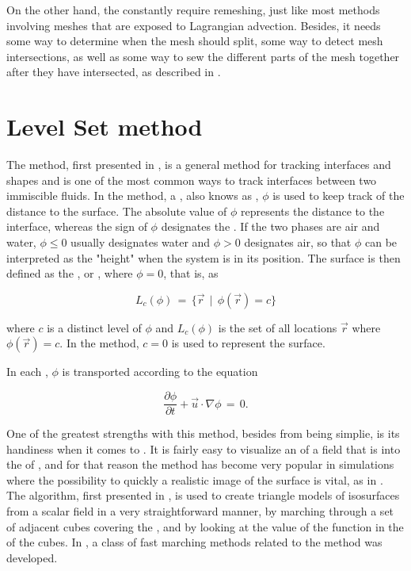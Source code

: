 On the other hand, the constantly require remeshing, just like most methods involving meshes that are exposed to Lagrangian advection. Besides, it needs some way to determine when the mesh should split, some way to detect mesh intersections, as well as some way to sew the different parts of the mesh together after they have intersected, as described in \citep{Wojtan2009}.

\section{Level Set method}

The \LS method, first presented in \citep{Osher1988}, is a general method for tracking interfaces and shapes and is one of the most common ways to track interfaces between two immiscible fluids. In the \LS method, a , also knows as , $\phi$ is used to keep track of the distance to the surface. The absolute value of $\phi$ represents the distance to the interface, whereas the sign of $\phi$ designates the \phase. If the two phases are air and water, $\phi \leq 0$ usually designates water and $\phi > 0$ designates air, so that $\phi$ can be interpreted as the "height" when the system is in its \equilibrium position. The surface is then defined as the \isosurface, or , where $\phi = 0$, that is, as

\begin{equation} \label{eq:level_set}
L_c(\phi) \,=\, \{\vec{r} \,\mid\, \phi(\vec{r})=c\}
\end{equation}

where $c$ is a distinct level of $\phi$ and $L_c(\phi)$ is the set of all locations $\vec{r}$ where $\phi(\vec{r}) = c$. In the \LS method, $c = 0$ is used to represent the surface.

In each , $\phi$ is transported according to the equation

\begin{equation} \label{eq:level_set_function_transport}
\frac{\partial\phi}{\partial t} + \vec{u}\cdot\nabla\phi \,=\, 0.
\end{equation}

One of the greatest strengths with this method, besides from being simplie, is its handiness when it comes to . It is fairly easy to visualize an \isosurface of a field that is \discretized into the \nodes of , and for that reason the \LS method has become very popular in \FVM simulations where the possibility to quickly \render a realistic image of the surface is vital, as in \citep{Losasso2004,Chentanez2011}. The  algorithm, first presented in \citep{Lorensen1987}, is used to create triangle models of isosurfaces from a scalar field in a very straightforward manner, by marching through a set of adjacent cubes covering the , and by looking at the value of the function in the  of the cubes. In \citep{Sethian1995}, a class of fast marching methods related to the \LS method was developed.

